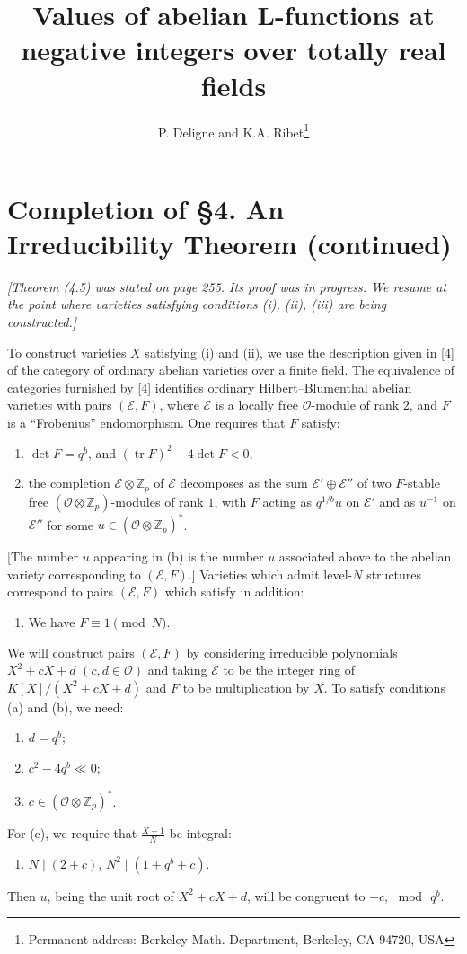 \documentclass[12pt,a4paper]{article}
\title{Values of abelian L-functions at negative integers over totally real fields}
\author{P. Deligne and K.A. Ribet\footnote{Permanent address: Berkeley Math. Department, Berkeley, CA 94720, USA}}
\date{}
\theoremstyle{plain}
\theoremstyle{definition}
\theoremstyle{remark}
\DeclareMathOperator{\tr}{tr}
\begin{document}

\section*{Completion of \S 4. An Irreducibility Theorem (continued)}

\textit{[Theorem \textup{(4.5)} was stated on page \textup{255}. Its proof was in progress. We resume at the point where varieties satisfying conditions (i), (ii), (iii) are being constructed.]}

To construct varieties $X$ satisfying (i) and (ii), we use the description given in [4] of the category of ordinary abelian varieties over a finite field. The equivalence of categories furnished by [4] identifies ordinary Hilbert--Blumenthal abelian varieties with pairs $(\mathscr{E}, F)$, where $\mathscr{E}$ is a locally free $\mathcal{O}$-module of rank $2$, and $F$ is a ``Frobenius'' endomorphism. One requires that $F$ satisfy:
\begin{enumerate}[label=(\alph*)]
\item $\det F = q^b$, and $(\tr F)^2 - 4\det F < 0$,
\item the completion $\mathscr{E} \otimes \mathbb{Z}_p$ of $\mathscr{E}$ decomposes as the sum $\mathscr{E}' \oplus \mathscr{E}''$ of two $F$-stable free $(\mathcal{O} \otimes \mathbb{Z}_p)$-modules of rank $1$, with $F$ acting as $q^{1/b}u$ on $\mathscr{E}'$ and as $u^{-1}$ on $\mathscr{E}''$ for some $u \in (\mathcal{O} \otimes \mathbb{Z}_p)^*$.
\end{enumerate}
[The number $u$ appearing in (b) is the number $u$ associated above to the abelian variety corresponding to $(\mathscr{E}, F)$.] Varieties which admit level-$N$ structures correspond to pairs $(\mathscr{E}, F)$ which satisfy in addition:
\begin{enumerate}[label=(\alph*), resume]
\item We have $F \equiv 1 \pmod{N}$.
\end{enumerate}
We will construct pairs $(\mathscr{E}, F)$ by considering irreducible polynomials $X^2 + cX + d$ $(c, d \in \mathcal{O})$ and taking $\mathscr{E}$ to be the integer ring of $K[X]/(X^2 + cX + d)$ and $F$ to be multiplication by $X$. To satisfy conditions (a) and (b), we need:
\begin{enumerate}[label=(\arabic*)]
\item $d = q^b$;
\item $c^2 - 4q^b \ll 0$;
\item $c \in (\mathcal{O} \otimes \mathbb{Z}_p)^*$.
\end{enumerate}
For (c), we require that $\frac{X-1}{N}$ be integral:
\begin{enumerate}[label=(\arabic*), resume]
\item $N \mid (2 + c)$, $N^2 \mid (1 + q^b + c)$.
\end{enumerate}
Then $u$, being the unit root of $X^2 + cX + d$, will be congruent to $-c$, $\bmod\, q^b$.
\end{document}
